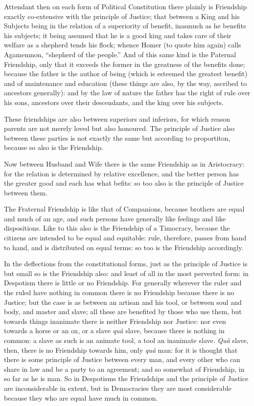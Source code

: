 
Attendant then on each form of Political Constitution there plainly is
Friendship exactly co-extensive with the principle of Justice; that between a
King and his Subjects being in the relation of a superiority of benefit,
inasmuch as he benefits his subjects; it being assumed that he is a good king
and takes care of their welfare as a shepherd tends his flock; whence Homer (to
quote him again) calls Agamemnon, “shepherd of the people.” And of
this same kind is the Paternal Friendship, only that it exceeds the former in
the greatness of the benefits done; because the father is the author of being
(which is esteemed the greatest benefit) and of maintenance and education
(these things are also, by the way, ascribed to ancestors generally): and by
the law of nature the father has the right of rule over his sons, ancestors
over their descendants, and the king over his subjects.

These friendships are also between superiors and inferiors, for which reason
parents are not merely loved but also honoured. The principle of Justice also
between these parties is not exactly the same but according to proportiton,
because so also is the Friendship.

Now between Husband and Wife there is the same Friendship as in Aristocracy:
for the relation is determined by relative excellence, and the better person
has the greater good and each has what befits: so too also is the principle of
Justice between them.

The Fraternal Friendship is like that of Companions, because brothers are equal
and much of an age, and such persons have generally like feelings and like
dispositions. Like to this also is the Friendship of a Timocracy, because the
citizens are intended to be equal and equitable: rule, therefore, passes from
hand to hand, and is distributed on equal terms: so too is the Friendship
accordingly.

In the deflections from the constitutional forms, just as the principle of
Justice is but small so is the Friendship also: and least of all in the most
perverted form: in Despotism there is little or no Friendship. For generally
wherever the ruler and the ruled have nothing in common there is no Friendship
because there is no Justice; but the case is as between an artisan and his
tool, or between soul and body, and master and slave; all these are benefited
by those who use them, but towards things inanimate there is neither Friendship
nor Justice: nor even towards a horse or an ox, or a slave \emph{quâ} slave,
because there is nothing in common: a slave as such is an animate tool, a tool
an inanimate slave. \emph{Quâ} slave, then, there is no Friendship towards him,
only \emph{quâ} man: for it is thought that there is some principle of Justice
between every man, and every other who can share in law and be a party to an
agreement; and so somewhat of Friendship, in so far as he is man. So in
Despotisms the Friendships and the principle of Justice are inconsiderable in
extent, but in Democracies they are most considerable because they who are
equal have much in common.

